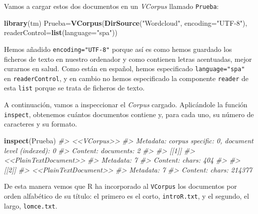 \documentclass[
]{book}
\newenvironment{Shaded}{\begin{snugshade}}{\end{snugshade}}
\newcommand{\CommentTok}[1]{\textcolor[rgb]{0.56,0.35,0.01}{\textit{#1}}}
\newcommand{\DataTypeTok}[1]{\textcolor[rgb]{0.13,0.29,0.53}{#1}}
\newcommand{\KeywordTok}[1]{\textcolor[rgb]{0.13,0.29,0.53}{\textbf{#1}}}
\newcommand{\NormalTok}[1]{#1}
\newcommand{\StringTok}[1]{\textcolor[rgb]{0.31,0.60,0.02}{#1}}
\theoremstyle{definition}
\theoremstyle{definition}
\theoremstyle{definition}
\theoremstyle{remark}
\begin{document}
Vamos a cargar estos dos documentos en un \emph{VCorpus} llamado \texttt{Prueba}:

\begin{Shaded}
\begin{Highlighting}[]
\KeywordTok{library}\NormalTok{(tm)}
\NormalTok{Prueba=}\KeywordTok{VCorpus}\NormalTok{(}\KeywordTok{DirSource}\NormalTok{(}\StringTok{"Wordcloud"}\NormalTok{, }\DataTypeTok{encoding=}\StringTok{"UTF{-}8"}\NormalTok{), }
\DataTypeTok{readerControl=}\KeywordTok{list}\NormalTok{(}\DataTypeTok{language=}\StringTok{"spa"}\NormalTok{))}
\end{Highlighting}
\end{Shaded}

Hemos añadido \texttt{encoding="UTF-8"} porque así es como hemos guardado los ficheros de texto en nuestro ordenador y como contienen letras acentuadas, mejor curarnos en salud. Como están en español, hemos especificado \texttt{language="spa"} en \texttt{readerControl}, y en cambio no hemos especificado la componente \texttt{reader} de esta \texttt{list} porque se trata de ficheros de texto.

A continuación, vamos a inspeccionar el \emph{Corpus} cargado. Aplicándole la función \texttt{inspect}, obtenemos cuántos documentos contiene y, para cada uno, su número de caracteres y su formato.

\begin{Shaded}
\begin{Highlighting}[]
\KeywordTok{inspect}\NormalTok{(Prueba)}
\CommentTok{\#\textgreater{} \textless{}\textless{}VCorpus\textgreater{}\textgreater{}}
\CommentTok{\#\textgreater{} Metadata:  corpus specific: 0, document level (indexed): 0}
\CommentTok{\#\textgreater{} Content:  documents: 2}
\CommentTok{\#\textgreater{} }
\CommentTok{\#\textgreater{} [[1]]}
\CommentTok{\#\textgreater{} \textless{}\textless{}PlainTextDocument\textgreater{}\textgreater{}}
\CommentTok{\#\textgreater{} Metadata:  7}
\CommentTok{\#\textgreater{} Content:  chars: 404}
\CommentTok{\#\textgreater{} }
\CommentTok{\#\textgreater{} [[2]]}
\CommentTok{\#\textgreater{} \textless{}\textless{}PlainTextDocument\textgreater{}\textgreater{}}
\CommentTok{\#\textgreater{} Metadata:  7}
\CommentTok{\#\textgreater{} Content:  chars: 214377}
\end{Highlighting}
\end{Shaded}

De esta manera vemos que R ha incorporado al \texttt{VCorpus} los documentos por orden alfabético de su título: el primero es el corto, \texttt{introR.txt}, y el segundo, el largo, \texttt{lomce.txt}.
\end{document}

